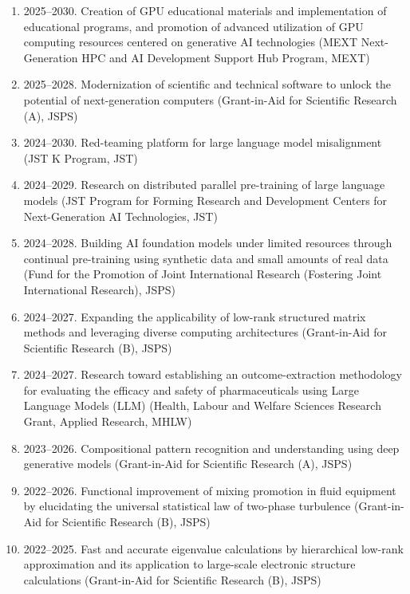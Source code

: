 \documentclass[margin,line]{cv}
\begin{document}
\begin{resume}
\begin{enumerate}
\item 2025--2030. Creation of GPU educational materials and implementation of educational programs, and promotion of advanced utilization of GPU computing resources centered on generative AI technologies (MEXT Next-Generation HPC and AI Development Support Hub Program, MEXT)

\item 2025--2028. Modernization of scientific and technical software to unlock the potential of next-generation computers (Grant-in-Aid for Scientific Research (A), JSPS)

\item 2024--2030. Red-teaming platform for large language model misalignment (JST K Program, JST)

\item 2024--2029. Research on distributed parallel pre-training of large language models (JST Program for Forming Research and Development Centers for Next-Generation AI Technologies, JST)

\item 2024--2028. Building AI foundation models under limited resources through continual pre-training using synthetic data and small amounts of real data (Fund for the Promotion of Joint International Research (Fostering Joint International Research), JSPS)

\item 2024--2027. Expanding the applicability of low-rank structured matrix methods and leveraging diverse computing architectures (Grant-in-Aid for Scientific Research (B), JSPS)

\item 2024--2027. Research toward establishing an outcome-extraction methodology for evaluating the efficacy and safety of pharmaceuticals using Large Language Models (LLM) (Health, Labour and Welfare Sciences Research Grant, Applied Research, MHLW)

\item 2023--2026. Compositional pattern recognition and understanding using deep generative models (Grant-in-Aid for Scientific Research (A), JSPS)

\item 2022--2026. Functional improvement of mixing promotion in fluid equipment by elucidating the universal statistical law of two-phase turbulence (Grant-in-Aid for Scientific Research (B), JSPS)

\item 2022--2025. Fast and accurate eigenvalue calculations by hierarchical low-rank approximation and its application to large-scale electronic structure calculations (Grant-in-Aid for Scientific Research (B), JSPS)


\end{enumerate}
\end{resume}
\end{document}
